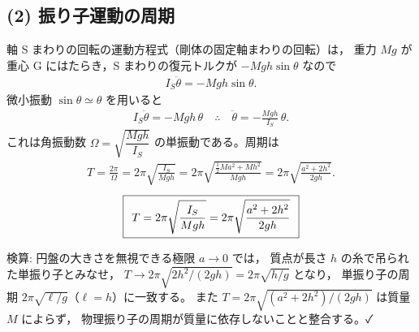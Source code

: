 \documentclass[11pt,a4paper]{article}
\begin{document}
\subsection*{(2) 振り子運動の周期}
軸 S まわりの回転の運動方程式（剛体の固定軸まわりの回転）は，
重力 $Mg$ が重心 G にはたらき，S まわりの復元トルクが $-Mgh\sin\theta$ なので
\begin{align*}
  I_S\ddot{\theta}=-Mgh\sin\theta.
\end{align*}
微小振動 $\sin\theta\simeq\theta$ を用いると
\begin{align*}
  I_S\ddot{\theta}=-Mgh\,\theta
  \quad\therefore\quad
  \ddot{\theta}=-\frac{Mgh}{I_S}\,\theta.
\end{align*}
これは角振動数 $\Omega=\sqrt{\dfrac{Mgh}{I_S}}$ の単振動である。周期は
\begin{align*}
  T=\frac{2\pi}{\Omega}=2\pi\sqrt{\frac{I_S}{Mgh}}
   =2\pi\sqrt{\frac{\tfrac12 Ma^2+Mh^2}{Mgh}}
   =2\pi\sqrt{\frac{a^2+2h^2}{2gh}}.
\end{align*}
\[
  \boxed{\,\;T=2\pi\sqrt{\dfrac{I_S}{Mgh}}
   =2\pi\sqrt{\dfrac{a^2+2h^2}{2gh}}\;\,}
\]

\medskip
検算: 円盤の大きさを無視できる極限 $a\to0$ では，
質点が長さ $h$ の糸で吊られた単振り子とみなせ，
$T\to2\pi\sqrt{2h^2/(2gh)}=2\pi\sqrt{h/g}$ となり，
単振り子の周期 $2\pi\sqrt{\ell/g}$（$\ell=h$）に一致する。
また $T=2\pi\sqrt{(a^2+2h^2)/(2gh)}$ は質量 $M$ によらず，
物理振り子の周期が質量に依存しないことと整合する。✓
\end{document}
